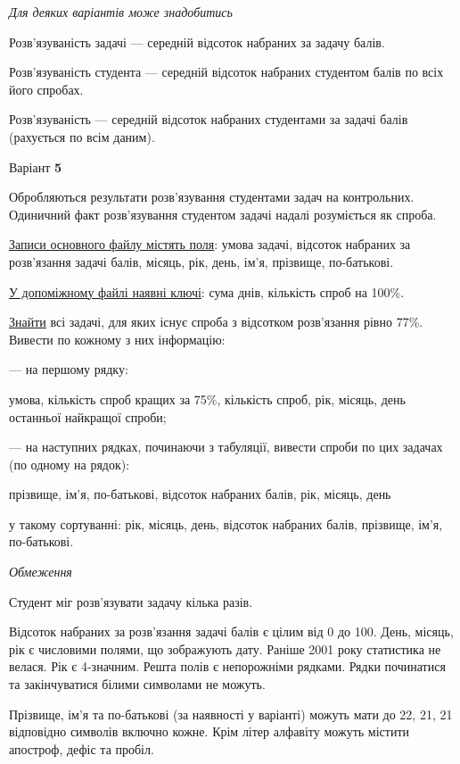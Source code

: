 \documentclass[11pt, ukrainian]{article}
\begin{document}
\bigskip\textit{Для деяких варіантів може знадобитись}

Розв'язуваність задачі --- середній відсоток набраних за задачу балів.

Розв'язуваність студента --- середній відсоток набраних студентом балів по всіх його спробах.

Розв'язуваність --- середній відсоток набраних студентами за задачі балів (рахується по всім даним).


\par
\newpage
{\center Варіант  \No \textbf { 5 }\par}
\bigskip
Обробляються результати розв’язування студентами задач на контрольних.
Одиничний факт роз\-в’я\-зу\-вання студентом задачі надалі розуміється як спроба.

\underline{Записи основного файлу містять поля}: умова задачі, відсоток набраних за розв’язання задачі балів, місяць, рік, день, ім’я, прізвище, по-батькові.

\underline{У допоміжному файлі наявні ключі}: сума днів, кількість спроб на 100\%.

\underline{Знайти} всі задачі, для яких існує спроба з відсотком розв’язання рівно 77\%. Вивести по кожному з них інформацію:\par
{\noindent}--- на першому рядку:\par
умова, кількість спроб кращих за 75\%, кількість спроб, рік, місяць, день останньої найкращої спроби;

{\noindent}--- на наступних рядках, починаючи з табуляції, вивести спроби по цих задачах (по одному на рядок):\par
прізвище, ім’я, по-батькові, відсоток набраних балів, рік, місяць, день

{\noindent}у такому сортуванні: рік, місяць, день, відсоток набраних балів, прізвище, ім’я, по-батькові.


\bigskip\textit{Обмеження}

Студент міг розв’язувати задачу кілька разів.

Відсоток набраних за розв’язання задачі балів є цілим від 0 до 100.
День, місяць, рік є числовими полями, що зображують дату.
Раніше 2001 року статистика не велася. Рік є 4-значним.
Решта полів є непорожніми рядками.
Рядки починатися та закінчуватися білими символами не можуть.

Прізвище, ім’я та по-батькові (за наявності у варіанті) можуть мати до 22, 21, 21 відповідно символів включно кожне. 
Крім літер алфавіту можуть містити апостроф, дефіс та пробіл.
\end{document}
